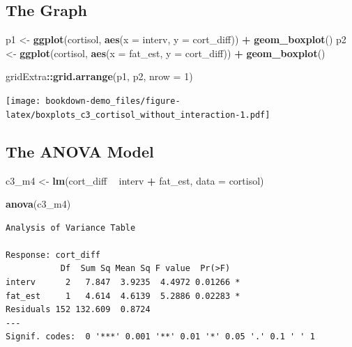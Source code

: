 \documentclass[]{book}
\newenvironment{Shaded}{\begin{snugshade}}{\end{snugshade}}
\newcommand{\KeywordTok}[1]{\textcolor[rgb]{0.13,0.29,0.53}{\textbf{#1}}}
\newcommand{\DataTypeTok}[1]{\textcolor[rgb]{0.13,0.29,0.53}{#1}}
\newcommand{\DecValTok}[1]{\textcolor[rgb]{0.00,0.00,0.81}{#1}}
\newcommand{\StringTok}[1]{\textcolor[rgb]{0.31,0.60,0.02}{#1}}
\newcommand{\OperatorTok}[1]{\textcolor[rgb]{0.81,0.36,0.00}{\textbf{#1}}}
\newcommand{\NormalTok}[1]{#1}
\theoremstyle{definition}
\theoremstyle{definition}
\theoremstyle{definition}
\theoremstyle{remark}
\begin{document}
\subsection{The Graph}\label{the-graph}

\begin{Shaded}
\begin{Highlighting}[]
\NormalTok{p1 <-}\StringTok{ }\KeywordTok{ggplot}\NormalTok{(cortisol, }\KeywordTok{aes}\NormalTok{(}\DataTypeTok{x =}\NormalTok{ interv, }\DataTypeTok{y =}\NormalTok{ cort_diff)) }\OperatorTok{+}\StringTok{ }
\StringTok{    }\KeywordTok{geom_boxplot}\NormalTok{()}
\NormalTok{p2 <-}\StringTok{ }\KeywordTok{ggplot}\NormalTok{(cortisol, }\KeywordTok{aes}\NormalTok{(}\DataTypeTok{x =}\NormalTok{ fat_est, }\DataTypeTok{y =}\NormalTok{ cort_diff)) }\OperatorTok{+}
\StringTok{    }\KeywordTok{geom_boxplot}\NormalTok{()}

\NormalTok{gridExtra}\OperatorTok{::}\KeywordTok{grid.arrange}\NormalTok{(p1, p2, }\DataTypeTok{nrow =} \DecValTok{1}\NormalTok{)}
\end{Highlighting}
\end{Shaded}

\texttt{[image: bookdown-demo\_files/figure-latex/boxplots\_c3\_cortisol\_without\_interaction-1.pdf]}

\subsection{The ANOVA Model}\label{the-anova-model}

\begin{Shaded}
\begin{Highlighting}[]
\NormalTok{c3_m4 <-}\StringTok{ }\KeywordTok{lm}\NormalTok{(cort_diff }\OperatorTok{~}\StringTok{ }\NormalTok{interv }\OperatorTok{+}\StringTok{ }\NormalTok{fat_est, }\DataTypeTok{data =}\NormalTok{ cortisol)}

\KeywordTok{anova}\NormalTok{(c3_m4)}
\end{Highlighting}
\end{Shaded}

\begin{verbatim}
Analysis of Variance Table

Response: cort_diff
           Df  Sum Sq Mean Sq F value  Pr(>F)  
interv      2   7.847  3.9235  4.4972 0.01266 *
fat_est     1   4.614  4.6139  5.2886 0.02283 *
Residuals 152 132.609  0.8724                  
---
Signif. codes:  0 '***' 0.001 '**' 0.01 '*' 0.05 '.' 0.1 ' ' 1
\end{verbatim}
\end{document}
